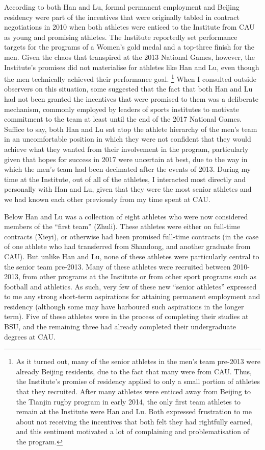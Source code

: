 \begin{CJK}{UTF8}{gbsn}
  According to both Han and Lu, formal permanent employment and Beijing residency were part of the incentives that were originally tabled in contract negotiations in 2010 when both athletes were enticed to the Institute from CAU as young and promising athletes.  The Institute reportedly set performance targets for the programs of a Women's gold medal and a top-three finish for the men.  Given the chaos that transpired at the 2013 National Games, however, the Institute's promises did not materialise for athletes like Han and Lu, even though the men technically achieved their performance goal.
      \footnote{As it turned out, many of the senior athletes in the men's team pre-2013 were already Beijing residents, due to the fact that many were from CAU.  Thus, the Institute's promise of residency applied to only a small portion of athletes that they recruited.  After many athletes were enticed away from Beijing to the Tianjin rugby program in early 2014, the only first team athletes to remain at the Institute were Han and Lu.  Both expressed frustration to me about not receiving the incentives that both felt they had rightfully earned, and this sentiment motivated a lot of complaining and problematisation of the program.}
  When I consulted outside observers on this situation, some suggested that the fact that both Han and Lu had not been granted the incentives that were promised to them was a deliberate mechanism, commonly employed by leaders of sports institutes to motivate commitment to the team at least until the end of the 2017 National Games.  Suffice to say, both Han and Lu sat atop the athlete hierarchy of the men's team in an uncomfortable position in which they were not confident that they would achieve what they wanted from their involvement in the program, particularly given that hopes for success in 2017 were uncertain at best, due to the way in which the men's team had been decimated after the events of 2013. During my time at the Institute, out of all of the athletes, I interacted most directly and personally with Han and Lu, given that they were the most senior athletes and we had known each other previously from my time spent at CAU.


  Below Han and Lu was a collection of eight athletes who were now considered members of the ``first team'' (Zhuli).   These athletes were either on full-time contracts (Xieyi), or otherwise had been promised full-time contracts (in the case of one athlete who had transferred from Shandong, and another graduate from CAU). But unlike Han and Lu, none of these athletes were particularly central to the senior team pre-2013.  Many of these athletes were recruited between 2010-2013, from other programs at the Institute or from other sport programs such as football and athletics.  As such, very few of these new ``senior athletes'' expressed to me any strong short-term aspirations for attaining permanent employment and residency (although some may have harboured such aspirations in the longer term). Five of these athletes were in the process of completing their studies at BSU, and the remaining three had already completed their undergraduate degrees at CAU.


\end{CJK}
